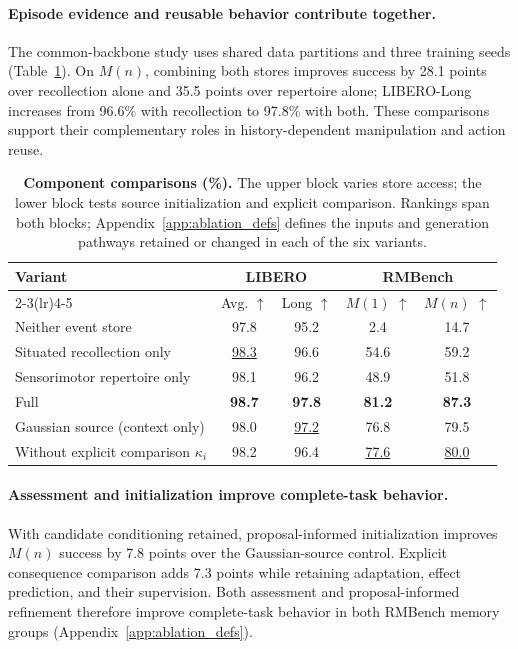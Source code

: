 \paragraph{Episode evidence and reusable behavior contribute together.}
The common-backbone study uses shared data partitions and three training seeds (Table~\ref{tab:ablation}).
On $M(n)$, combining both stores improves success by 28.1 points over recollection alone and 35.5 points over repertoire alone; LIBERO-Long increases from 96.6\% with recollection to 97.8\% with both.
These comparisons support their complementary roles in history-dependent manipulation and action reuse.
\begin{table}[t]
\centering
\small
\setlength{\tabcolsep}{12pt}
\renewcommand{\arraystretch}{1.08}
\caption{\textbf{Component comparisons (\%).} The upper block varies store access; the lower block tests source initialization and explicit comparison. Rankings span both blocks; Appendix~\ref{app:ablation_defs} defines the inputs and generation pathways retained or changed in each of the six variants.}
\label{tab:ablation}
\begin{tabular}{@{}lcccc@{}}
\toprule
\multirow[c]{2}{*}{Variant} & \multicolumn{2}{c}{LIBERO} & \multicolumn{2}{c}{RMBench} \\
\cmidrule(lr){2-3}\cmidrule(lr){4-5}
& Avg. $\uparrow$ & Long $\uparrow$ & $M(1)$ $\uparrow$ & $M(n)$ $\uparrow$ \\
\midrule
Neither event store & 97.8 & 95.2 & 2.4 & 14.7 \\
Situated recollection only & \underline{98.3} & 96.6 & 54.6 & 59.2 \\
Sensorimotor repertoire only & 98.1 & 96.2 & 48.9 & 51.8 \\
\rowcolor{blue!7}
Full \method{} & \textbf{98.7} & \textbf{97.8} & \textbf{81.2} & \textbf{87.3} \\
\midrule
Gaussian source (context only) & 98.0 & \underline{97.2} & 76.8 & 79.5 \\
Without explicit comparison $\kappa_i$ & 98.2 & 96.4 & \underline{77.6} & \underline{80.0} \\
\bottomrule
\end{tabular}
\end{table}
\paragraph{Assessment and initialization improve complete-task behavior.}
With candidate conditioning retained, proposal-informed initialization improves $M(n)$ success by 7.8 points over the Gaussian-source control.
Explicit consequence comparison adds 7.3 points while retaining adaptation, effect prediction, and their supervision.
Both assessment and proposal-informed refinement therefore improve complete-task behavior in both RMBench memory groups (Appendix~\ref{app:ablation_defs}).

